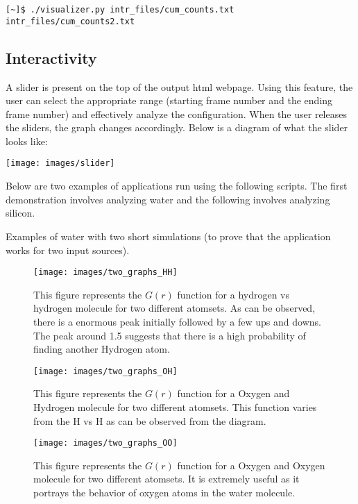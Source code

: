 \begin{verbatim}
[~]$ ./visualizer.py intr_files/cum_counts.txt intr_files/cum_counts2.txt 
\end{verbatim}


\subsection*{Interactivity}

A slider is present on the top of the output html webpage. Using this feature, the user can select the appropriate range (starting frame number and the ending frame number) and effectively analyze the configuration. When the user releases the sliders, the graph changes accordingly. Below is a diagram of what the slider looks like:


\texttt{[image: images/slider]}


Below are two examples of applications run using the following scripts. The first demonstration involves analyzing water and the following involves analyzing silicon. 

Examples of water with two short simulations (to prove that the application works for two input sources).

\begin{figure}[H]
\centering
\texttt{[image: images/two\_graphs\_HH]}
\caption{This figure represents the $G(r)$ function for a hydrogen vs hydrogen molecule for two different atomsets. As can be observed, there is a enormous peak initially followed by a few ups and downs. The peak around 1.5 suggests that there is a high probability of finding another Hydrogen atom.}
\end{figure}

\begin{figure}[H]
\centering
\texttt{[image: images/two\_graphs\_OH]}
\caption{This figure represents the $G(r)$ function for a Oxygen and Hydrogen molecule for two different atomsets. This function varies from the H vs H as can be observed from the diagram.}
\end{figure}

\begin{figure}[H]
\centering
\texttt{[image: images/two\_graphs\_OO]}
\caption{This figure represents the $G(r)$ function for a Oxygen and Oxygen molecule for two different atomsets. It is extremely useful as it portrays the behavior of oxygen atoms in the water molecule.}
\end{figure}


